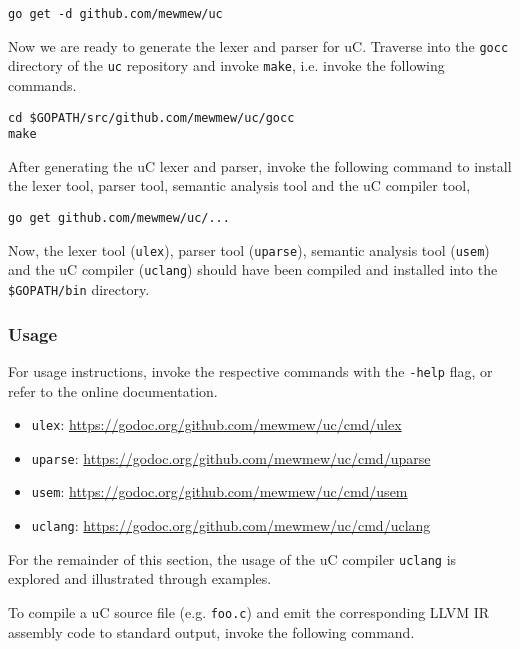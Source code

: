\begin{verbatim}
go get -d github.com/mewmew/uc
\end{verbatim}

Now we are ready to generate the lexer and parser for uC. Traverse into the \texttt{gocc} directory of the \texttt{uc} repository and invoke \texttt{make}, i.e. invoke the following commands.

\begin{verbatim}
cd $GOPATH/src/github.com/mewmew/uc/gocc
make
\end{verbatim}

After generating the uC lexer and parser, invoke the following command to install the lexer tool, parser tool, semantic analysis tool and the uC compiler tool,

\begin{verbatim}
go get github.com/mewmew/uc/...
\end{verbatim}

Now, the lexer tool (\texttt{ulex}), parser tool (\texttt{uparse}), semantic analysis tool (\texttt{usem}) and the uC compiler (\texttt{uclang}) should have been compiled and installed into the \verb+$GOPATH/bin+ directory.

\subsubsection{Usage}

For usage instructions, invoke the respective commands with the \verb+-help+ flag, or refer to the online documentation.

\begin{itemize}
	\item \texttt{ulex}: \url{https://godoc.org/github.com/mewmew/uc/cmd/ulex}
	\item \texttt{uparse}: \url{https://godoc.org/github.com/mewmew/uc/cmd/uparse}
	\item \texttt{usem}: \url{https://godoc.org/github.com/mewmew/uc/cmd/usem}
	\item \texttt{uclang}: \url{https://godoc.org/github.com/mewmew/uc/cmd/uclang}
\end{itemize}

For the remainder of this section, the usage of the uC compiler \texttt{uclang} is explored and illustrated through examples.

To compile a uC source file (e.g. \texttt{foo.c}) and emit the corresponding LLVM IR assembly code to standard output, invoke the following command.

